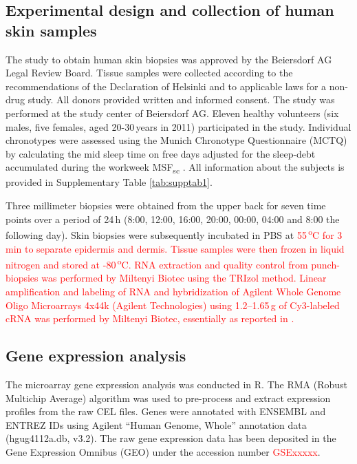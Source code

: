 \subsection*{Experimental design and collection of human skin samples}
The study to obtain human skin biopsies was approved by the Beiersdorf AG Legal Review Board. Tissue samples were collected according to the recommendations of the Declaration of Helsinki and to applicable laws for a non-drug study. All donors provided written and informed consent. The study was performed at the study center of Beiersdorf AG. Eleven healthy volunteers (six males, five females, aged 20-30\,years in 2011) participated in the study. Individual chronotypes were assessed using the Munich Chronotype Questionnaire (MCTQ) by calculating the mid sleep time on free days adjusted for the sleep-debt accumulated during the workweek MSF\textsubscript{sc} \cite{Vetter2021}. All information about the subjects is provided in Supplementary Table \ref{tab:supptab1}.  %

Three millimeter biopsies were obtained from the upper back for seven time points over a period of 24\,h (8:00, 12:00, 16:00, 20:00, 00:00, 04:00 and 8:00 the following day). Skin biopsies were subsequently incubated in PBS at \textcolor{red}{55\,\textsuperscript{o}C for 3\,min to separate epidermis and dermis. Tissue samples were then frozen in liquid nitrogen and stored at -80\,\textsuperscript{o}C. RNA extraction and quality control from punch-biopsies was performed by Miltenyi Biotec using the TRIzol method. Linear amplification and labeling of RNA and hybridization of Agilent Whole Genome Oligo Microarrays 4x44k (Agilent Technologies) using 1.2--1.65\,\textmu g of Cy3-labeled cRNA was performed by Miltenyi Biotec, essentially as reported in \cite{Duggan1999}.}  

\subsection*{Gene expression analysis}
The microarray gene expression analysis was conducted in R. The RMA (Robust Multichip Average) algorithm was used to pre-process and extract expression profiles from the raw CEL files. Genes were annotated with ENSEMBL and ENTREZ IDs using Agilent ``Human Genome, Whole'' annotation data (hgug4112a.db, v3.2). The raw gene expression data has been deposited in the Gene Expression Omnibus (GEO) under the accession number \textcolor{red}{GSExxxxx}. 

